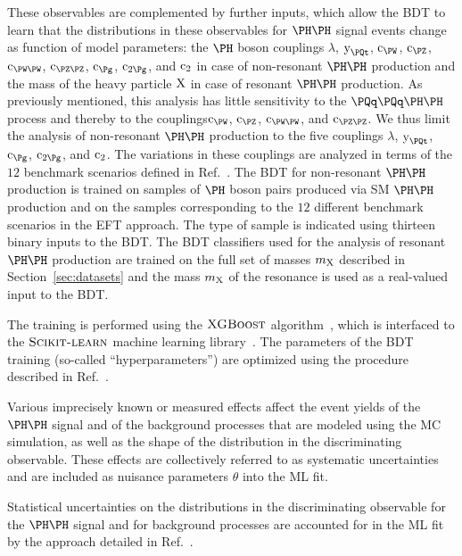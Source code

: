 These observables are complemented by further inputs, which allow the BDT to learn that the distributions in these observables for $\HH$ signal events
change as function of model parameters:
the $\PHiggs$ boson couplings $\lambda$, $\yt$, $\cW$, $\cZ$, $\cWW$, $\cZZ$, $\cg$, $\cgg$, and $\text{c}_{2}$ in case of non-resonant $\HH$ production
and the mass of the heavy particle $\textrm{X}$ in case of resonant $\HH$ production.
As previously mentioned, this analysis has little sensitivity to the $\qqHH$ process and thereby to the couplings$\cW$, $\cZ$, $\cWW$, and $\cZZ$.
We thus limit the analysis of non-resonant $\HH$ production to the five couplings $\lambda$, $\yt$, $\cg$, $\cgg$, and $\text{c}_{2}$.
The variations in these couplings are analyzed in terms of the $12$ benchmark scenarios defined in Ref.~\cite{Carvalho:2015ttv}.
The BDT for non-resonant $\HH$ production is trained on samples of $\PHiggs$ boson pairs produced via SM $\HH$ production
and on the samples corresponding to the $12$ different benchmark scenarios in the EFT approach.
The type of sample is indicated using thirteen binary inputs to the BDT.
The BDT classifiers used for the analysis of resonant $\HH$ production are trained on the full set of masses $m_{\textrm{X}}$ described in Section~\ref{sec:datasets}
and the mass $m_{\textrm{X}}$ of the resonance is used as a real-valued input to the BDT.

The training is performed using the $\textsc{XGBoost}$ algorithm~\cite{Chen:2016btl},
which is interfaced to the $\textsc{Scikit-learn}$ machine learning library~\cite{scikit-learn}.
The parameters of the BDT training (so-called ``hyperparameters'') are optimized using the procedure described in Ref.~\cite{Tani:2020dyi}.

Various imprecisely known or measured effects affect the event yields of the $\HH$ signal and of the background processes that are modeled using the MC simulation,
as well as the shape of the distribution in the discriminating observable.
These effects are collectively referred to as systematic uncertainties and are included as nuisance parameters $\theta$ into the ML fit.

Statistical uncertainties on the distributions in the discriminating observable for the $\HH$ signal and for background processes
are accounted for in the ML fit by the approach detailed in Ref.~\cite{Barlow:1993dm}.



